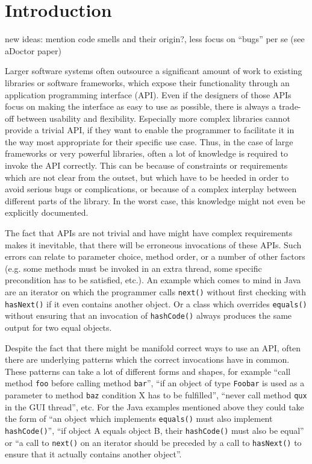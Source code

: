 \chapter{Introduction}\label{chapter:introduction}

new ideas:
    mention code smells and their origin?, less focus on ``bugs'' per se (see aDoctor paper)

Larger software systems often outsource a significant amount of work to existing libraries or software frameworks, which expose their functionality through an application programming interface (API).
Even if the designers of those APIs focus on making the interface as easy to use as possible, there is always a trade-off between usability and flexibility.
Especially more complex libraries cannot provide a trivial API, if they want to enable the programmer to facilitate it in the way most appropriate for their specific use case.
Thus, in the case of large frameworks or very powerful libraries, often a lot of knowledge is required to invoke the API correctly.
This can be because of constraints or requirements which are not clear from the outset, but which have to be heeded in order to avoid serious bugs or complications, or because of a complex interplay between different parts of the library.
In the worst case, this knowledge might not even be explicitly documented.

The fact that APIs are not trivial and have might have complex requirements makes it inevitable, that there will be erroneous invocations of these APIs.
Such errors can relate to parameter choice, method order, or a number of other factors (e.g. some methods must be invoked in an extra thread, some specific precondition has to be satisfied, etc.).
An example which comes to mind in Java are an iterator on which the programmer calls \texttt{next()} without first checking with \texttt{hasNext()} if it even contains another object.
Or a class which overrides \texttt{equals()} without ensuring that an invocation of \texttt{hashCode()} always produces the same output for two equal objects.

Despite the fact that there might be manifold correct ways to use an API, often there are underlying patterns which the correct invocations have in common.
These patterns can take a lot of different forms and shapes, for example ``call method \texttt{foo} before calling method \texttt{bar}'', ``if an object of type \texttt{Foobar} is used as a parameter to method \texttt{baz} condition X has to be fulfilled'', ``never call method \texttt{qux} in the GUI thread'', etc.
For the Java examples mentioned above they could take the form of ``an object which implements \texttt{equals()} must also implement \texttt{hashCode()}'', ``if object A equals object B, their \texttt{hashCode()} must also be equal'' or ``a call to \texttt{next()} on an iterator should be preceded by a call to \texttt{hasNext()} to ensure that it actually contains another object''.

